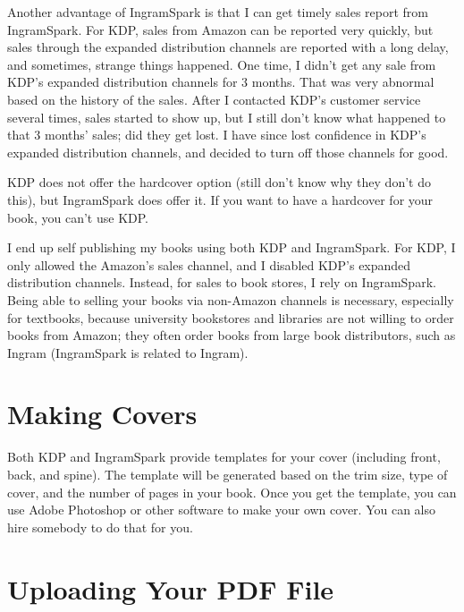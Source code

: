 Another advantage of IngramSpark is that I can get timely sales report from IngramSpark. For 
KDP, sales from Amazon can be reported very quickly, but sales through the expanded
distribution channels are reported with a long delay, and sometimes, strange things happened. 
One time, I didn't get any sale from
KDP's expanded distribution channels for 3 months. That was very abnormal based on the history
of the sales. After I contacted
KDP's customer service several times, sales started to show up, but I still don't know what happened to that
3 months' sales; did they get lost. I have since lost confidence in KDP's expanded distribution
channels, and decided to turn off those channels for good.


KDP does not offer the hardcover option (still don't know why they don't do this), but
IngramSpark does offer it. If you want to have a hardcover for your book, you can't use KDP.


I end up self publishing my books using both KDP and IngramSpark. For KDP, I only allowed the
Amazon's sales channel, and I disabled KDP's expanded distribution channels. 
Instead, for sales to book stores, I rely on IngramSpark. 
Being able to selling your books via non-Amazon channels is necessary, 
especially for textbooks, because 
university bookstores and libraries are not willing to order books from Amazon; 
they often order books from large book distributors, such as Ingram (IngramSpark is
related to Ingram). 





\section{Making Covers} 

Both KDP and IngramSpark provide templates for your cover (including front, back, and spine). 
The template will be generated based on the trim size, type of cover, and the number of pages
in your book. Once you get the template, you can use Adobe Photoshop or other software to
make your own cover. You can also hire somebody to do that for you. 



\section{Uploading Your PDF File}



